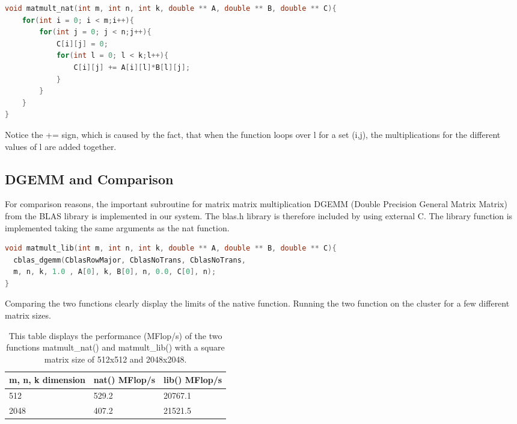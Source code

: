 \begin{lstlisting}[language=C++, caption=Function Prototype]
void matmult_nat(int m, int n, int k, double ** A, double ** B, double ** C){
	for(int i = 0; i < m;i++){
		for(int j = 0; j < n;j++){
			C[i][j] = 0;
			for(int l = 0; l < k;l++){
				C[i][j] += A[i][l]*B[l][j];
			}
		}
	}
}
\end{lstlisting}

Notice the += sign, which is caused by the fact, that when the function loops over l for a set (i,j), the multiplications for the different values of l are added together.


\subsection{DGEMM and Comparison}

For comparison reasons, the important subroutine for matrix matrix multiplication DGEMM (Double Precision General Matrix Matrix) from the BLAS library is implemented in our system. The blas.h library is therefore included by using external C. The library function is implemented taking the same arguments as the nat function.

\begin{lstlisting}[language=C++, caption=lib]
void matmult_lib(int m, int n, int k, double ** A, double ** B, double ** C){
  cblas_dgemm(CblasRowMajor, CblasNoTrans, CblasNoTrans, 
  m, n, k, 1.0 , A[0], k, B[0], n, 0.0, C[0], n);
}
\end{lstlisting}

Comparing the two functions clearly display the limits of the native function. Running the two function on the cluster for a few different matrix sizes.


\begin{table}[h!]
\centering
\caption{This table displays the performance (MFlop/s) of the two functions matmult\_nat() and matmult\_lib() with a square matrix size of 512x512 and 2048x2048.}
\label{Table:nat}
\begin{tabular}{|l|l|l|}
\hline m, n, k dimension  & nat() MFlop/s  & lib() MFlop/s \\ \hline
	512 &	529.2 & 20767.1 \\ \hline	
		2048 &	407.2 & 21521.5 \\ \hline	
\end{tabular}
\end{table}



